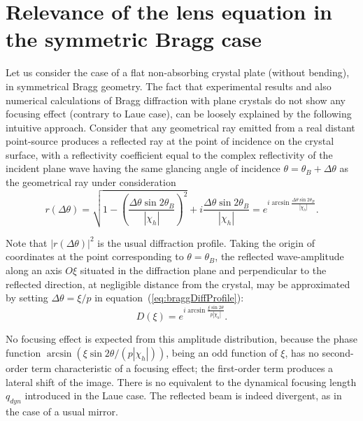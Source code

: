 \documentclass[preprint]{iucr}              %
\begin{document}
\section{Relevance of the lens equation in the symmetric Bragg case}
\label{sec:BraggGeometry}

Let us consider the case of a flat non-absorbing crystal plate (without bending), in symmetrical Bragg geometry. The fact that experimental results and also numerical calculations \cite{Honkanen2018} of Bragg diffraction with plane crystals do not show any focusing effect (contrary to Laue case), can be loosely explained by the following intuitive approach. Consider that any geometrical ray emitted from a real distant point-source produces a reflected ray at the point of incidence on the crystal surface, with a reflectivity coefficient equal to the complex reflectivity of the incident plane wave having the same glancing angle of incidence $\theta=\theta_B+\Delta\theta$ as the geometrical ray under consideration
\begin{equation}
\label{eq:braggDiffProfile}
    r(\Delta\theta) = \sqrt{1-\left(\frac{\Delta\theta\sin2\theta_B}{|\chi_h|}\right)^2} + i \frac{\Delta\theta\sin2\theta_B}{|\chi_h|} =
    e^{i \arcsin{\frac{\Delta\theta \sin2\theta_B}{ |\chi_h|}}}.
\end{equation}

Note that $|r(\Delta\theta)|^2$ is the usual diffraction profile. Taking the origin of coordinates at the point corresponding to $\theta=\theta_B$, the reflected wave-amplitude along an axis $O\xi$ situated in the diffraction plane and perpendicular to the reflected direction, at negligible distance from the crystal, may be approximated by setting  $\Delta\theta=\xi/p$ in equation~(\ref{eq:braggDiffProfile}):
\begin{equation}
    D(\xi) = e^{i \arcsin{\frac{\xi \sin2\theta}{p |\chi_h|}}}.
\end{equation}

No focusing effect is expected from this amplitude distribution, because the phase function $\arcsin(\xi \sin2\theta/ (p |\chi_h|))$, being an odd function of $\xi$, has no second-order term characteristic of a focusing effect; the first-order term produces a lateral shift of the image. There is no equivalent to the dynamical focusing length $q_{dyn}$ introduced in the Laue case. The reflected beam is indeed divergent, as in the case of a usual mirror.
\end{document}
